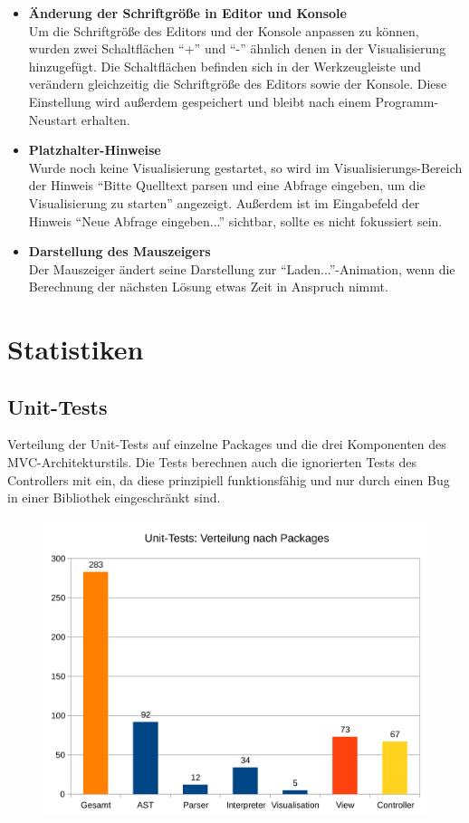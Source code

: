 \documentclass[parskip=full,11pt,twoside]{scrartcl}
\begin{document}
\begin{itemize}
  \item \textbf{Änderung der Schriftgröße in Editor und Konsole}\\
        Um die Schriftgröße des Editors und der Konsole anpassen zu können, wurden zwei Schaltflächen \enquote{+} und \enquote{-} ähnlich denen in der Visualisierung hinzugefügt. Die Schaltflächen befinden sich in der Werkzeugleiste und verändern gleichzeitig die Schriftgröße des Editors sowie der Konsole. Diese Einstellung wird außerdem gespeichert und bleibt nach einem Programm-Neustart erhalten.
  \item \textbf{Platzhalter-Hinweise}\\
        Wurde noch keine Visualisierung gestartet, so wird im Visualisierungs-Bereich der Hinweis \enquote{Bitte Quelltext parsen und eine Abfrage eingeben, um die Visualisierung zu starten} angezeigt. Außerdem ist im Eingabefeld der Hinweis \enquote{Neue Abfrage eingeben...} sichtbar, sollte es nicht fokussiert sein.
  \item \textbf{Darstellung des Mauszeigers}\\
        Der Mauszeiger ändert seine Darstellung zur \enquote{Laden...}-Animation, wenn die Berechnung der nächsten Lösung etwas Zeit in Anspruch nimmt.
\end{itemize}

\section{Statistiken}

\subsection{Unit-Tests}
Verteilung der Unit-Tests auf einzelne Packages und die drei Komponenten des MVC-Architekturstils. Die Tests berechnen auch die ignorierten Tests des Controllers mit ein, da diese prinzipiell funktionsfähig und nur durch einen Bug in einer Bibliothek eingeschränkt sind.

\begin{figure}[!h]
	\centering
	\includegraphics[width=0.75\linewidth]{images/tests_packages.png}
\end{figure}
\end{document}
